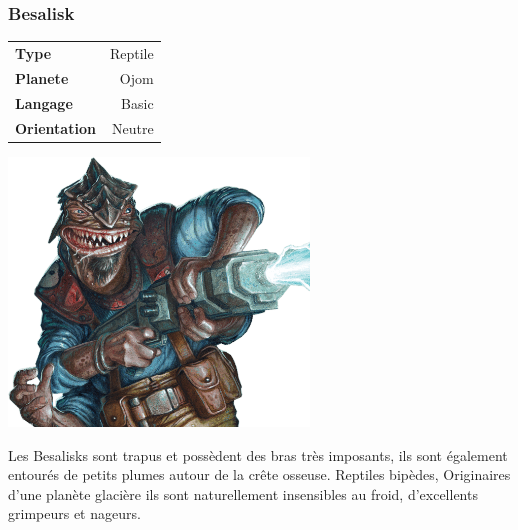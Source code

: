 \subsubsection{Besalisk}
\vspace{-2\baselineskip}
\begin{flushright}	
    \begin{tabular}{|l|r|}
        \textbf{Type} & Reptile \\
        \textbf{Planete} & Ojom \\
        \textbf{Langage} & Basic \\
        \textbf{Orientation} & Neutre\\
    \end{tabular}
\end{flushright}
\vspace{-3\baselineskip}
\includegraphics[width=8cm]{img/personnages/races/besalisk.png}
 
Les Besalisks sont trapus et possèdent des bras très imposants, ils sont également entourés de petits plumes autour de la crête osseuse. Reptiles bipèdes, Originaires d’une planète glacière ils sont naturellement insensibles au froid, d’excellents grimpeurs et nageurs. 

